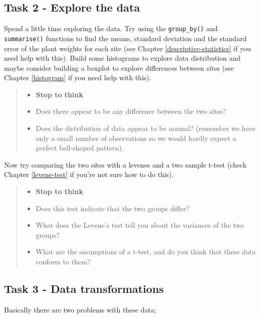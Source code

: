 \documentclass[
]{book}
\providecommand{\tightlist}{%
  \setlength{\itemsep}{0pt}\setlength{\parskip}{0pt}}
\begin{document}
\subsection{Task 2 - Explore the data}\label{c7t2}

Spend a little time exploring the data. Try using the \texttt{group\_by()} and \texttt{summarise()} functions to find the means, standard deviation and the standard error of the plant weights for each site (see Chapter \ref{descriptive-statistics} if you need help with this). Build some histograms to explore data distribution and maybe consider building a boxplot to explore differences between sites (see Chapter \ref{histogram} if you need help with this).

\begin{quote}
\begin{itemize}
\tightlist
\item
  \textbf{Stop to think}
\item
  Does there appear to be any difference between the two sites?
\item
  Does the distribution of data appear to be normal? (remember we have only a small number of observations so we would hardly expect a perfect bell-shaped pattern).
\end{itemize}
\end{quote}

Now try comparing the two sites with a levenes and a two sample t-test (check Chapter \ref{levene-test} if you're not sure how to do this).

\begin{quote}
\begin{itemize}
\tightlist
\item
  \textbf{Stop to think}
\item
  Does this test indicate that the two groups differ?
\item
  What does the Levene's test tell you about the variances of the two groups?
\item
  What are the assumptions of a t-test, and do you think that these data conform to them?
\end{itemize}
\end{quote}

\subsection{Task 3 - Data transformations}\label{c7t3}

Basically there are two problems with these data;
\end{document}
